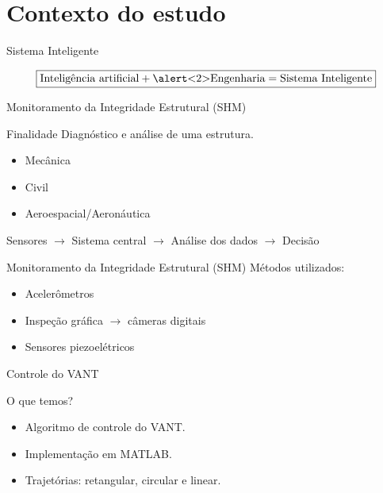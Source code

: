 \section{Contexto do estudo}

\begin{frame}{Sistema Inteligente}

\[\boxed{\text{Inteligência artificial} + \text{\alert<2>{Engenharia}} = \text{Sistema Inteligente}}\] 
    
\end{frame}

\begin{frame}{Monitoramento da Integridade Estrutural (SHM)}

\begin{block}{Finalidade}
    Diagnóstico e análise de uma estrutura.
\end{block} \pause

\begin{itemize}
    \item Mecânica
    \item Civil
    \item Aeroespacial/Aeronáutica
\end{itemize} \pause
\vfill
Sensores \(\rightarrow\) Sistema central \(\rightarrow\) Análise dos dados \(\rightarrow\) Decisão
\end{frame}

\begin{frame}{Monitoramento da Integridade Estrutural (SHM)}
Métodos utilizados:

\begin{itemize}
    \item Acelerômetros
    \item Inspeção gráfica \(\rightarrow\) câmeras digitais
    \item \alert<2>{Sensores piezoelétricos}
\end{itemize}

\end{frame}

\begin{frame}{Controle do VANT}
\pause

\begin{block}{O que temos?}
    \begin{itemize}
        \item Algoritmo de controle do VANT.
        \item Implementação em MATLAB.
        \item Trajetórias: retangular, circular e linear.
    \end{itemize}
\end{block} \pause
\begin{figure}
    \centering
    
    \end{figure}
\end{frame}


